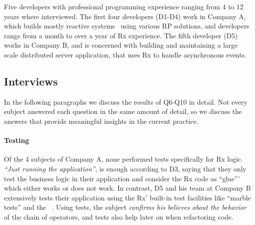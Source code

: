 Five developers with professional programming experience ranging from 4 to 12 years where interviewed.
The first four developers (D1-D4) work in Company A, which builds mostly reactive systems~\cite{boner2014reactive} using various RP solutions,
and developers range from a month to over a year of Rx experience. 
The fifth developer (D5) works in Company B, and is concerned with building and maintaining a large scale distributed server application, that uses Rx to handle asynchronous events.

\subsection{Interviews}
In the following paragraphs we discuss the results of Q6-Q10 in detail. Not every subject answered each question in the same amount of detail, so we discuss the answers that provide meaningful insights in the current practice.

\paragraph{Testing}
Of the 4 subjects of Company A, none performed tests specifically for Rx logic. \emph{``Just running the application''}, is enough according to D3, saying that they only test the business logic in their application and consider the Rx code as ``glue''' which either works or does not work. In contrast, D5 and his team at Company B extensively tests their application using the Rx' built-in test facilities like ``marble tests'' and the ~\cite{reactivex}. Using tests, the subject \emph{confirms his believes about the behavior} of the chain of operators, and tests also help later on when refactoring code.

